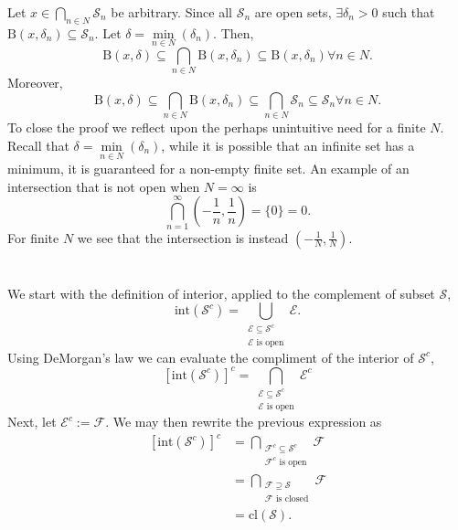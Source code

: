\documentclass[12 pt,letterpaper]{article}
\begin{document}
Let \(x\in\underset{n\in N}{\bigcap} \mathcal{S}_n\) be arbitrary.
Since all \(\mathcal{S}_n\) are open sets,
\(\exists\delta_n>0\) such that \(\text{B}(x,\delta_n)\subseteq\mathcal{S}_n\).
Let \(\delta=\underset{n\in N}{\min}(\delta_n)\).
Then, 
\[
    \text{B}(x,\delta)
    \subseteq\underset{n\in N}{\bigcap}\text{B}(x,\delta_n)
    \subseteq\text{B}(x,\delta_n)\forall n\in N.
\]
Moreover, 
\[
    \text{B}(x,\delta)
    \subseteq\underset{n\in N}{\bigcap}\text{B}(x,\delta_n)
    \subseteq \underset{n\in N}{\bigcap}\mathcal{S}_n
    \subseteq\mathcal{S}_n \forall n\in N.
\]
To close the proof we reflect upon the perhaps unintuitive need for a finite \(N\).
Recall that \(\delta=\underset{n\in N}{\min}(\delta_n)\),
while it is possible that an infinite set has a minimum,
it is guaranteed for a non-empty finite set.
An example of an intersection that is not open when \(N=\infty\) is
\[  \bigcap_{n=1}^{\infty} \left(-\frac{1}{n},\frac{1}{n}\right) = \{0\} = 0.  \]
For finite \(N\) we see that the intersection is instead \(\left(-\frac{1}{N},\frac{1}{N}\right)\).

\section{}

We start with the definition of interior, applied to the complement of subset \(\mathcal{S}\),
\[
    \text{int}(\mathcal{S}^c)
    = \bigcup_{\substack{\mathcal{E}\subseteq\mathcal{S}^c\\\mathcal{E}\text{ is open}}}
    \mathcal{E}.
\]
Using DeMorgan's law we can evaluate the compliment of the interior of \(\mathcal{S}^c\),
\[
    \left[\text{int}(\mathcal{S}^c)\right]^c
    = \bigcap_{\substack{\mathcal{E}\subseteq\mathcal{S}^c\\\mathcal{E}\text{ is open}}}
    \mathcal{E}^c
\]
Next, let \(\mathcal{E}^c := \mathcal{F}\). We may then rewrite the previous expression as
\begin{align*}
    \left[\text{int}(\mathcal{S}^c)\right]^c
    &= \bigcap_{\substack{\mathcal{F}^c\subseteq\mathcal{S}^c\\\mathcal{F}^c\text{ is open}}}
    \mathcal{F} \\
    &= \bigcap_{\substack{\mathcal{F}\supseteq\mathcal{S}\\\mathcal{F}\text{ is closed}}}
    \mathcal{F} \\
    &= \text{cl}(\mathcal{S}).
\end{align*}

\clearpage
\end{document}
